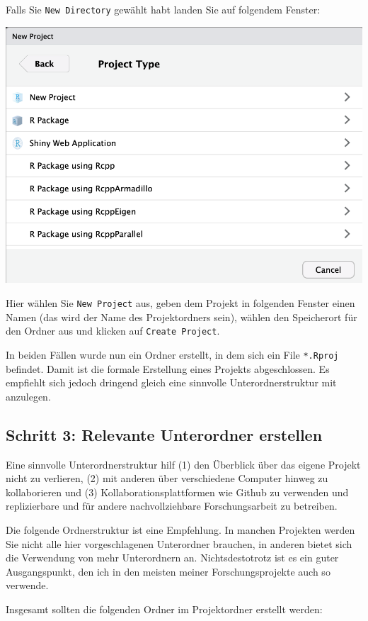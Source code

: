 \documentclass[]{tufte-book}
\begin{document}
Falls Sie \texttt{New\ Directory} gewählt habt landen Sie auf folgendem
Fenster:

\begin{center}\includegraphics[width=0.6\linewidth]{figures/r-studio-new-project-new-dir} \end{center}

Hier wählen Sie \texttt{New\ Project} aus, geben dem Projekt in
folgenden Fenster einen Namen (das wird der Name des Projektordners
sein), wählen den Speicherort für den Ordner aus und klicken auf
\texttt{Create\ Project}.

In beiden Fällen wurde nun ein Ordner erstellt, in dem sich ein File
\texttt{*.Rproj} befindet. Damit ist die formale Erstellung eines
Projekts abgeschlossen. Es empfiehlt sich jedoch dringend gleich eine
sinnvolle Unterordnerstruktur mit anzulegen.

\hypertarget{unterordner}{\subsection{Schritt 3: Relevante Unterordner
erstellen}\label{unterordner}}

Eine sinnvolle Unterordnerstruktur hilf (1) den Überblick über das
eigene Projekt nicht zu verlieren, (2) mit anderen über verschiedene
Computer hinweg zu kollaborieren und (3) Kollaborationsplattformen wie
Github zu verwenden und replizierbare und für andere nachvollziehbare
Forschungsarbeit zu betreiben.

Die folgende Ordnerstruktur ist eine Empfehlung. In manchen Projekten
werden Sie nicht alle hier vorgeschlagenen Unterordner brauchen, in
anderen bietet sich die Verwendung von mehr Unterordnern an.
Nichtsdestotrotz ist es ein guter Ausgangspunkt, den ich in den meisten
meiner Forschungsprojekte auch so verwende.

Insgesamt sollten die folgenden Ordner im Projektordner erstellt werden:
\end{document}
